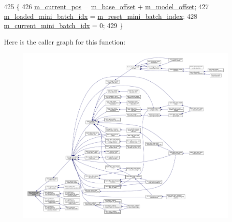 \begin{DoxyCode}
425                               \{
426     \hyperlink{classlbann_1_1generic__data__reader_a2facf4e410099ac8c1fa586e797ec2e0}{m\_current\_pos} = \hyperlink{classlbann_1_1generic__data__reader_a77946c4dca753c23f39e9a490eba1229}{m\_base\_offset} + \hyperlink{classlbann_1_1generic__data__reader_a5d9a0efd1ebe43a74911c35ffe84edc9}{m\_model\_offset};
427     \hyperlink{classlbann_1_1generic__data__reader_a2cfc5a3e6de8a8a24d3525ec3ed586fb}{m\_loaded\_mini\_batch\_idx} = \hyperlink{classlbann_1_1generic__data__reader_af29f62579a408d1548a124442bcf181d}{m\_reset\_mini\_batch\_index};
428     \hyperlink{classlbann_1_1generic__data__reader_aefd4bc0bf95de1e2500827581acf3536}{m\_current\_mini\_batch\_idx} = 0;
429   \}
\end{DoxyCode}
Here is the caller graph for this function\+:\nopagebreak
\begin{figure}[H]
\begin{center}
\leavevmode
\includegraphics[width=350pt]{classlbann_1_1generic__data__reader_ac6d4a5ba1d4e1134620cddcac343bf59_icgraph}
\end{center}
\end{figure}
\mbox{\label{classlbann_1_1generic__data__reader_ac1f3f81ca0e2920658cba026fe09a95b}} 
